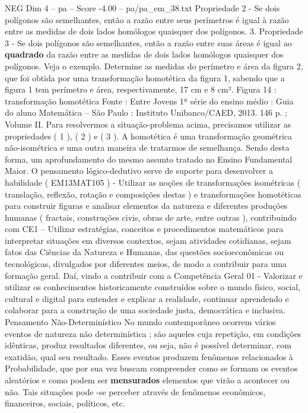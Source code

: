 \begin{textsample}{NEG Dim 4 – pa – Score -4.00 – pa/pa\_em\_38.txt}
Propriedade 2 - Se dois polígonos são semelhantes, então a razão entre seus perímetros é igual à razão entre as medidas de dois lados homólogos quaisquer dos polígonos. 3.
Propriedade 3 - Se dois polígonos são semelhantes, então a razão entre suas áreas é igual ao \textbf{quadrado} da razão entre as medidas de dois lados homólogos quaisquer dos polígonos.
Veja o exemplo.
Determine as medidas do perímetro e área da figura 2, que foi obtida por uma transformação homotética da figura 1, sabendo que a figura 1 tem perímetro e área, respectivamente, 17 cm e 8 cm².
Figura 14 : transformação homotética Fonte : Entre Jovens 1ª série do ensino médio : Guia do aluno Matemática – São Paulo : Instituto Unibanco/CAED, 2013. 146 p. ; Volume II.
Para resolvermos a situação-problema acima, precisamos utilizar as propriedades ( 1 ), ( 2 ) e ( 3 ).
A homotética é uma transformação geométrica não-isométrica e uma outra maneira de tratarmos de semelhança.
Sendo desta forma, um aprofundamento do mesmo assunto tratado no Ensino Fundamental Maior.
O pensamento lógico-dedutivo serve de suporte para desenvolver a habilidade ( EM13MAT105 ) - Utilizar as noções de transformações isométricas ( translação, reflexão, rotação e composições destas ) e transformações homotéticas para construir figuras e analisar elementos da natureza e diferentes produções humanas ( fractais, construções civis, obras de arte, entre outras ), contribuindo com CE1 – Utilizar estratégias, conceitos e procedimentos matemáticos para interpretar situações em diversos contextos, sejam atividades cotidianas, sejam fatos das Ciências da Natureza e Humanas, das questões socioeconômicas ou tecnológicas, divulgados por diferentes meios, de modo a contribuir para uma formação geral.
Daí, vindo a contribuir com a Competência Geral 01 - Valorizar e utilizar os conhecimentos historicamente construídos sobre o mundo físico, social, cultural e digital para entender e explicar a realidade, continuar aprendendo e colaborar para a construção de uma sociedade justa, democrática e inclusiva.
Pensamento Não-Determinístico No mundo contemporâneo ocorrem vários eventos de natureza não determinística ; são aqueles cuja repetição, em condições idênticas, produz resultados diferentes, ou seja, não é possível determinar, com exatidão, qual seu resultado.
Esses eventos produzem fenômenos relacionados à Probabilidade, que por sua vez buscam compreender como se formam os eventos aleatórios e como podem ser \textbf{mensurados} elementos que virão a acontecer ou não.
Tais situações pode -se perceber através de fenômenos econômicos, financeiros, sociais, políticos, etc.

\end{textsample}
